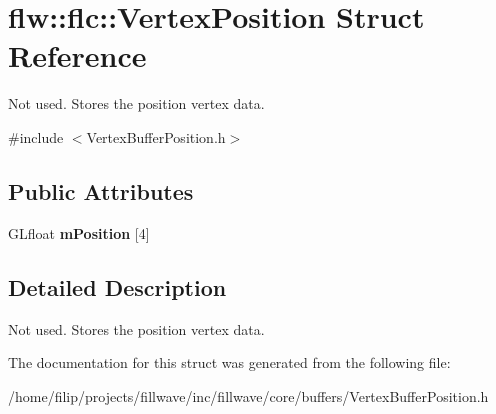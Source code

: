 \hypertarget{structflw_1_1flc_1_1VertexPosition}{}\section{flw\+:\+:flc\+:\+:Vertex\+Position Struct Reference}
\label{structflw_1_1flc_1_1VertexPosition}


Not used. Stores the position vertex data.  




{\ttfamily \#include $<$Vertex\+Buffer\+Position.\+h$>$}

\subsection*{Public Attributes}
\begin{DoxyCompactItemize}
\item 
\mbox{\label{structflw_1_1flc_1_1VertexPosition_a9f42294a01f445359f57ab3bceb26498}} 
G\+Lfloat {\bfseries m\+Position} \mbox{[}4\mbox{]}
\end{DoxyCompactItemize}


\subsection{Detailed Description}
Not used. Stores the position vertex data. 

The documentation for this struct was generated from the following file\+:\begin{DoxyCompactItemize}
\item 
/home/filip/projects/fillwave/inc/fillwave/core/buffers/Vertex\+Buffer\+Position.\+h\end{DoxyCompactItemize}
